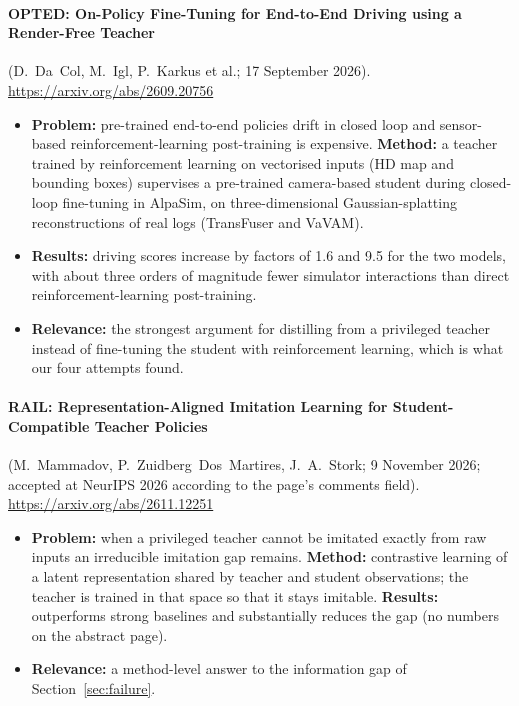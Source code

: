 \paragraph{OPTED: On-Policy Fine-Tuning for End-to-End Driving using a Render-Free Teacher} (D.~Da~Col, M.~Igl, P.~Karkus et al.; 17 September 2026). \url{https://arxiv.org/abs/2609.20756}
\begin{itemize}
\item \textbf{Problem:} pre-trained end-to-end policies drift in closed loop and sensor-based reinforcement-learning post-training is expensive. \textbf{Method:} a teacher trained by reinforcement learning on vectorised inputs (HD map and bounding boxes) supervises a pre-trained camera-based student during closed-loop fine-tuning in AlpaSim, on three-dimensional Gaussian-splatting reconstructions of real logs (TransFuser and VaVAM).
\item \textbf{Results:} driving scores increase by factors of 1.6 and 9.5 for the two models, with about three orders of magnitude fewer simulator interactions than direct reinforcement-learning post-training.
\item \textbf{Relevance:} the strongest argument for distilling from a privileged teacher instead of fine-tuning the student with reinforcement learning, which is what our four attempts found.
\end{itemize}

\paragraph{RAIL: Representation-Aligned Imitation Learning for Student-Compatible Teacher Policies} (M.~Mammadov, P.~Zuidberg~Dos~Martires, J.~A.~Stork; 9 November 2026; accepted at NeurIPS 2026 according to the page's comments field). \url{https://arxiv.org/abs/2611.12251}
\begin{itemize}
\item \textbf{Problem:} when a privileged teacher cannot be imitated exactly from raw inputs an irreducible imitation gap remains. \textbf{Method:} contrastive learning of a latent representation shared by teacher and student observations; the teacher is trained in that space so that it stays imitable. \textbf{Results:} outperforms strong baselines and substantially reduces the gap (no numbers on the abstract page).
\item \textbf{Relevance:} a method-level answer to the information gap of Section~\ref{sec:failure}.
\end{itemize}
